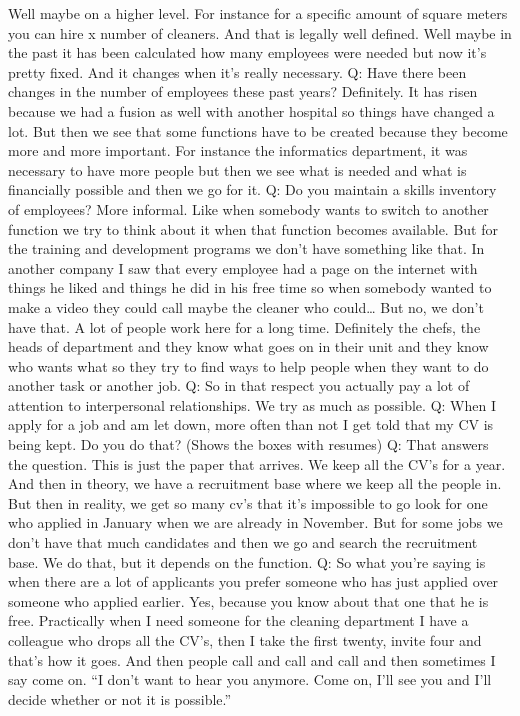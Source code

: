 \documentclass[a4paper,fleqn,11pt,dvips,titlepage]{article}
\numberwithin{figure}{section}
\numberwithin{equation}{section}
\begin{document}
Well maybe on a higher level. For instance for a specific amount of square meters you can hire x number of cleaners. And that is legally well defined. Well maybe in the past it has been calculated how many employees were needed but now it’s pretty fixed. And it changes when it’s really necessary. 
Q: Have there been changes in the number of employees these past years? 
Definitely. It has risen because we had a fusion as well with another hospital so things have changed a lot. But then we see that some functions have to be created because they become more and more important. For instance the informatics  department, it was necessary to have more people but then we see what is needed and what is financially possible and then we go for it. 
Q: Do you maintain a skills inventory of employees? 
More informal. Like  when somebody wants to switch to another function we try to think about it when that function becomes available. But for the training and development programs we don’t have something like that. In another company I saw that every employee had a page on the internet with things he liked and things he did in his free time so when somebody wanted to make a video they could call maybe the cleaner who could… But no, we don’t have that. A lot of people work here for a long time. Definitely the chefs, the heads of department and they know what goes on in their unit and they know who wants what so they try to find ways to help people when they want to do another task or another job. 
Q: So in that respect you actually pay a lot of attention to interpersonal relationships. 
 We try as much as possible. 
Q: When I apply for a job and am let down, more often than not I get told that my CV is being kept. Do you do that? 
(Shows the boxes with resumes) 
Q: That answers the question.
This is just the paper that arrives. We keep all the CV’s for a year. And then in theory, we have a recruitment base where we keep all the people in. But then in reality, we get so many cv’s that it’s impossible to go look for one who applied in January when we are already in November. But for some jobs we don’t have that much candidates and then we go and search the recruitment base. We do that, but it depends on the function. 
Q: So what you’re saying is when there are a lot of applicants you prefer someone who has just applied over someone who applied earlier. 
Yes, because you know about that one that he is free. Practically when I need someone for the cleaning department I have a colleague who drops all the CV’s, then I take the first twenty, invite four and that’s how it goes. And then people call and call and call and then sometimes I say come on. “I don’t want to hear you anymore. Come on, I’ll see you and I’ll decide whether or not it is possible.”
\end{document}
